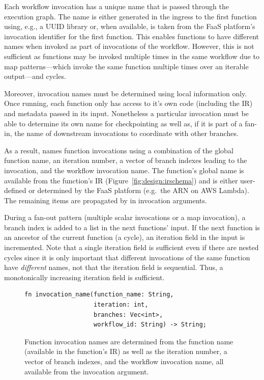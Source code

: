 Each workflow invocation has a unique name that is passed through the execution
graph. The name is either generated in the ingress to the first function using,
e.g., a UUID library or, when available, is taken from the FaaS platform's
invocation identifier for the first function. This enables functions to have
different names when invoked as part of invocations of the workflow. However,
this is not sufficient as functions may be invoked multiple times in the same
workflow due to map patterns---which invoke the same function multiple times over
an iterable output---and cycles.

Moreover, invocation names must be determined using local information only. Once
running, each function only has access to it's own code (including the IR) and
metadata passed in its input. Nonetheless a particular invocation must be able
to determine its own name for checkpointing as well as, if it is part of a
fan-in, the name of downstream invocations to coordinate with other branches.

As a result, \name{} names function invocations using a combination of the
global function name, an iteration number, a vector of branch indexes leading to
the invocation, and the workflow invocation name. The function's global name is
available from the function's IR (Figure~\ref{fig:design:irschema}) and is either user-defined
or determined by the FaaS platform (e.g.\ the ARN on AWS Lambda). The remaining
items are propagated by \name{} in invocation arguments.

During a fan-out pattern (multiple scalar invocations or a map invocation), a
branch index is added to a list in the next functions' input. If the next
function is an ancestor of the current function (a cycle), an iteration field in
the input is incremented. Note that a single iteration field is sufficient even
if there are nested cycles since it is only important that different invocations
of the same function have \emph{different} names, not that the iteration field
is sequential. Thus, a monotonically increasing iteration field is sufficient.

\begin{figure}
\begin{verbatim}
fn invocation_name(function_name: String,
                   iteration: int,
                   branches: Vec<int>,
                   workflow_id: String) -> String;
\end{verbatim}
\label{fig:design:names}
\caption{Function invocation names are determined from the function name
(available in the function's IR) as well as the iteration number, a vector of
branch indexes, and the workflow invocation name, all available from the
invocation argument.}
\end{figure}

